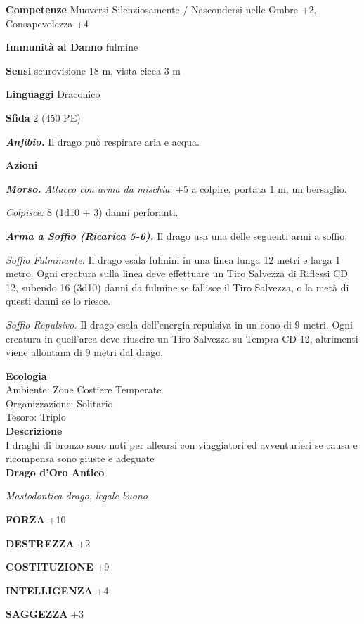 \begin{multicols}{2}
\textbf{Competenze} Muoversi Silenziosamente / Nascondersi nelle Ombre +2, Consapevolezza +4

\textbf{Immunità al Danno} fulmine

\textbf{Sensi} scurovisione 18 m, vista cieca 3 m

\textbf{Linguaggi} Draconico

\textbf{Sfida} 2 (450 PE)

\emph{\textbf{Anfibio.}} Il drago può respirare aria e acqua.

\textbf{Azioni}

\emph{\textbf{Morso.} Attacco con arma da mischia}: +5 a colpire,
portata 1 m, un bersaglio.

\emph{Colpisce:} 8 (1d10 + 3) danni perforanti.

\emph{\textbf{Arma a Soffio (Ricarica 5-6).}} Il drago usa una delle seguenti armi a soffio:

\emph{Soffio Fulminante.} Il drago esala fulmini in una linea lunga 12 metri e larga 1 metro. Ogni creatura sulla linea deve effettuare un Tiro Salvezza di Riflessi CD 12, subendo 16 (3d10) danni da fulmine se fallisce il Tiro Salvezza, o la metà di questi danni se lo riesce.

\emph{Soffio Repulsivo.} Il drago esala dell'energia repulsiva in un cono di 9 metri. Ogni creatura in quell'area deve riuscire un Tiro Salvezza su Tempra CD 12, altrimenti viene allontana di 9 metri dal drago.

\textbf{Ecologia}\\
Ambiente: Zone Costiere Temperate\\
Organizzazione: Solitario\\
Tesoro: Triplo\\
\textbf{Descrizione}\\
I draghi di bronzo sono noti per allearsi con viaggiatori ed avventurieri se causa e ricompensa sono giuste e adeguate\\



\medskip{}\textbf{Drago d'Oro Antico}

\emph{Mastodontica drago, legale buono}

\textbf{FORZA} +10

\textbf{DESTREZZA} +2

\textbf{COSTITUZIONE} +9

\textbf{INTELLIGENZA} +4

\textbf{SAGGEZZA} +3


\end{multicols}
